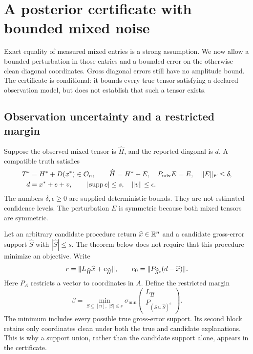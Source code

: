 \section{A posterior certificate with bounded mixed noise}\label{sec:stability}
Exact equality of measured mixed entries is a strong assumption. We now allow a bounded perturbation in those entries and a bounded error on the otherwise clean diagonal coordinates. Gross diagonal errors still have no amplitude bound. The certificate is conditional: it bounds every true tensor satisfying a declared observation model, but does not establish that such a tensor exists.

\subsection{Observation uncertainty and a restricted margin}
Suppose the observed mixed tensor is $\widehat H$, and the reported diagonal is $d$. A compatible truth satisfies
\begin{align}
 T^*&=H^*+D(x^*)\in\mathcal O_n,\qquad
 \widehat H=H^*+E,\quad P_{\rm mix}E=E,\quad \lVert E\rVert_F\le\delta,\label{eq:noisy-mixed}\\
 d&=x^*+e+v,\qquad |\operatorname{supp} e|\le s,\quad \lVert v\rVert\le\epsilon.\label{eq:noisy-diag}
\end{align}
The numbers $\delta,\epsilon\ge0$ are supplied deterministic bounds. They are not estimated confidence levels. The perturbation $E$ is symmetric because both mixed tensors are symmetric.

Let an arbitrary candidate procedure return $\widehat x\in\mathbb R^n$ and a candidate gross-error support $\widehat S$ with $|\widehat S|\le s$. The theorem below does not require that this procedure minimize an objective. Write
\begin{equation}\label{eq:noisy-residuals}
 r=\lVert L_{\widehat H}\widehat x+c_{\widehat H}\rVert,
 \qquad e_0=\lVert P_{\widehat S^c}(d-\widehat x)\rVert.
\end{equation}
Here $P_A$ restricts a vector to coordinates in $A$. Define the restricted margin
\begin{equation}\label{eq:beta}
 \beta=\min_{S\subseteq[n],\ |S|\le s}
 \sigma_{\min}\!\begin{pmatrix}
 L_{\widehat H}\\ P_{(S\cup\widehat S)^c}
 \end{pmatrix}.
\end{equation}
The minimum includes every possible true gross-error support. Its second block retains only coordinates clean under both the true and candidate explanations. This is why a support union, rather than the candidate support alone, appears in the certificate.

